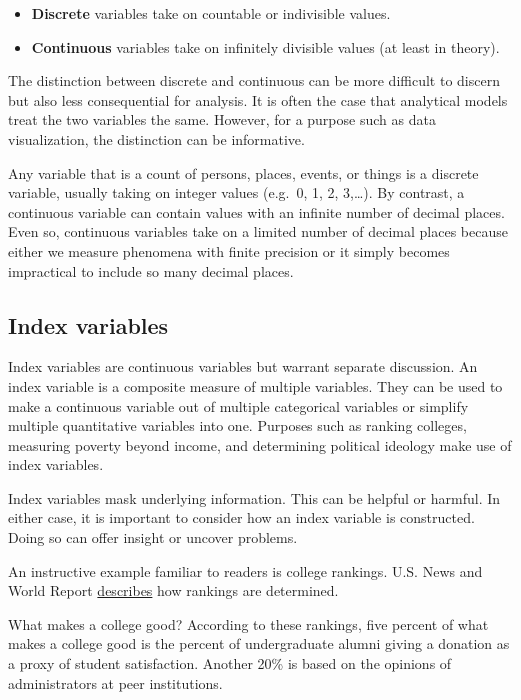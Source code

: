 \documentclass[
]{book}
\providecommand{\tightlist}{%
  \setlength{\itemsep}{0pt}\setlength{\parskip}{0pt}}
\begin{document}
\begin{itemize}
\tightlist
\item
  \textbf{Discrete} variables take on countable or indivisible values.
\item
  \textbf{Continuous} variables take on infinitely divisible values (at least in theory).
\end{itemize}

The distinction between discrete and continuous can be more difficult to discern but also less consequential for analysis. It is often the case that analytical models treat the two variables the same. However, for a purpose such as data visualization, the distinction can be informative.

Any variable that is a count of persons, places, events, or things is a discrete variable, usually taking on integer values (e.g.~0, 1, 2, 3,\ldots). By contrast, a continuous variable can contain values with an infinite number of decimal places. Even so, continuous variables take on a limited number of decimal places because either we measure phenomena with finite precision or it simply becomes impractical to include so many decimal places.

\hypertarget{index-variables}{%
\subsection{Index variables}\label{index-variables}}

Index variables are continuous variables but warrant separate discussion. An index variable is a composite measure of multiple variables. They can be used to make a continuous variable out of multiple categorical variables or simplify multiple quantitative variables into one. Purposes such as ranking colleges, measuring poverty beyond income, and determining political ideology make use of index variables.

Index variables mask underlying information. This can be helpful or harmful. In either case, it is important to consider how an index variable is constructed. Doing so can offer insight or uncover problems.

An instructive example familiar to readers is college rankings. U.S. News and World Report \href{https://www.usnews.com/education/best-colleges/articles/ranking-criteria-and-weights}{describes} how rankings are determined.

What makes a college good? According to these rankings, five percent of what makes a college good is the percent of undergraduate alumni giving a donation as a proxy of student satisfaction. Another 20\% is based on the opinions of administrators at peer institutions.
\end{document}
